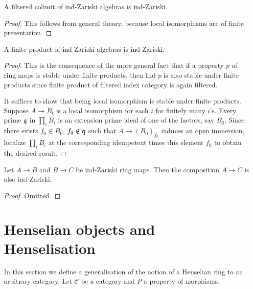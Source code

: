 \begin{lemma}
    A filtered colimit of ind-Zariski algebras is ind-Zariski.
    \label{lemma:ind-ind-Zariski}
\end{lemma}

\begin{proof}
    This follows from general theory, because local isomorphisms are of finite presentation.
\end{proof}

\begin{lemma}
  A finite product of ind-Zariski algebras is ind-Zariski.
  \label{lemma:ind-Zariski-products}
\end{lemma}

\begin{proof}
  This is the consequence of the more general fact that if a property $p$ of ring maps is stable under finite products, then Ind-$p$ is also stable under finite products since finite product of filtered index category is again filtered. 
  
  It suffices to show that being local isomorphism is stable under finite products. Suppose $A \to B_i$ is a local isomorphism for each $i$ for finitely many $i$'s. Every prime ${\mathfrak{q}}$ in $\prod_i B_i$ is an extension prime ideal of one of the factors, say $B_0$. Since there exists $f_0 \in B_0$, $f_0 \notin {\mathfrak{q}}$ such that $A \to (B_0)_{f_0}$ induces an open immersion, localize $\prod_i B_i$ at the corresponding idempotent times this element \(f_0\) to obtain the desired result.
\end{proof}

\begin{lemma}
  \label{thm:ind-Zariski-composition}
  Let \(A \to B\) and \(B \to C\) be ind-Zariski ring maps. Then the composition \(A \to C\) is also ind-Zariski.
\end{lemma}

\begin{proof}
  Omitted.
\end{proof}

\section{Henselian objects and Henselisation}

In this section we define a generalisation of the notion of a Henselian ring to an arbitrary category. Let $\mathcal{C}$ be a category
and $P$ a property of morphisms.

